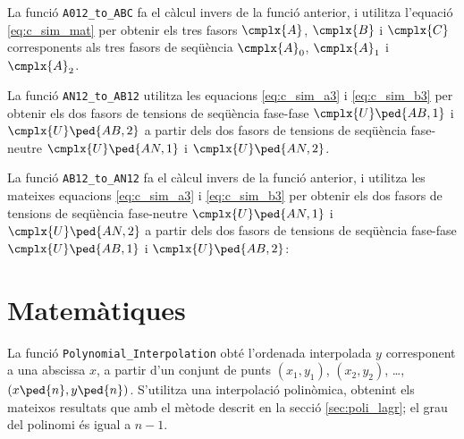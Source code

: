 


La funció \texttt{A012\_to\_ABC} fa el càlcul  invers de la funció anterior, i utilitza l'equació \eqref{eq:c_sim_mat} per obtenir els tres fasors
$\cmplx{A}$, $\cmplx{B}$ i $\cmplx{C}$  corresponents als tres fasors de seqüència
$\cmplx{A}_0$, $\cmplx{A}_1$ i  $\cmplx{A}_2$.




La funció \texttt{AN12\_to\_AB12} utilitza les equacions  \eqref{eq:c_sim_a3} i \eqref{eq:c_sim_b3} per obtenir els dos fasors de tensions de seqüència fase-fase $\cmplx{U}\ped{AB,1}$ i  $\cmplx{U}\ped{AB,2}$ a partir dels dos fasors de tensions de seqüència fase-neutre $\cmplx{U}\ped{AN,1}$ i $\cmplx{U}\ped{AN,2}$.




La funció \texttt{AB12\_to\_AN12} fa el càlcul invers de la funció anterior, i utilitza les mateixes equacions  \eqref{eq:c_sim_a3} i \eqref{eq:c_sim_b3} per obtenir els dos fasors de tensions de seqüència fase-neutre $\cmplx{U}\ped{AN,1}$ i $\cmplx{U}\ped{AN,2}$ a partir dels dos fasors de tensions de seqüència fase-fase $\cmplx{U}\ped{AB,1}$ i  $\cmplx{U}\ped{AB,2}$:




\section{Matemàtiques}\label{sec:HP_MATH}

La funció \texttt{Polynomial\_Interpolation} obté l'ordenada interpolada $y$ corresponent a una abscissa $x$, a partir d'un conjunt  de punts $(x_1,y_1)$, $(x_2,y_2)$, \ldots, $(x\ped{n},y\ped{n})$. S'utilitza una interpolació polinòmica, obtenint els mateixos resultats que amb el mètode descrit en la secció \vref{sec:poli_lagr}; el grau del polinomi és igual a $n-1$.

